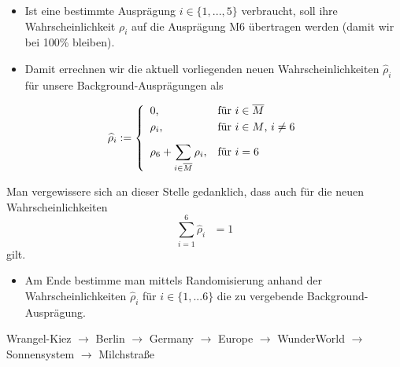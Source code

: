\begin{Algo}
\begin{itemize}
    \item Ist eine bestimmte Ausprägung $i \in \lbrace 1,...,5 \rbrace$ verbraucht, soll ihre Wahrscheinlichkeit $\rho_i$ auf die Ausprägung M6 übertragen werden (damit wir bei 100\% bleiben).

    \item Damit errechnen wir die aktuell vorliegenden neuen Wahrscheinlichkeiten $\widehat{\rho}_i$ für unsere Background-Ausprägungen als
\end{itemize} 

\[
\widehat{\rho}_i:=\left\{%
\begin{array}{ll}
	\hbox{0,} & \hbox{für $i \in \overline{M}$} \\[0,1cm] 
    \hbox{$\rho_i$,} & \hbox{für $i \in M$, $i \neq 6$} \\[0,3cm]
    \displaystyle \rho_6 + \sum_{i \in \overline{M}} \rho_i, & \hbox{für $i = 6$} \\
\end{array}%
\right.
\]

Man vergewissere sich an dieser Stelle gedanklich, dass auch für die neuen \newline Wahrscheinlichkeiten \[\sum_{i = 1}^6 \widehat{\rho}_i \textrm{ } = 1\] gilt.

\begin{itemize}
    \item Am Ende bestimme man mittels Randomisierung anhand der Wahrscheinlichkeiten $\widehat{\rho}_i$ für $i \in \lbrace 1,...6 \rbrace$ die zu vergebende Background-Ausprägung. 
\end{itemize}

\end{Algo}



\vspace{0.5cm}

\begin{NFT-Prop}[Community]


\vspace{0.2cm}

Wrangel-Kiez $\rightarrow$ Berlin $\rightarrow$ Germany $\rightarrow$ Europe $\rightarrow$ WunderWorld $\rightarrow$ Sonnensystem $\rightarrow$ Milchstraße

\end{NFT-Prop}



\vspace{0.5cm}

